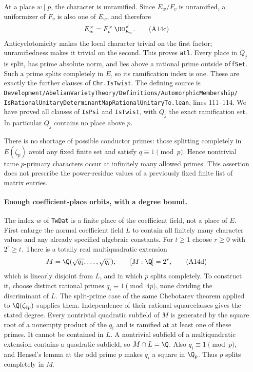 At a place $w\mid p$, the character is unramified.  Since
$E_w/F_v$ is unramified, a uniformizer of $F_v$ is also one of $E_w$,
and therefore
\[
 E_w^\times=F_v^\times\,\OO_{E_w}^\times.
 \tag{A14c}
\]
Anticyclotomicity makes the local character trivial on the first
factor; unramifiedness makes it trivial on the second.  This proves
\texttt{atl}.  Every place in $Q_j$ is split, has prime absolute norm,
and lies above a rational prime outside \texttt{offSet}.  Such a prime
splits completely in $E$, so its ramification index is one.  These are
exactly the further clauses of \texttt{Chr.IsTwist}.  The defining
source is
\texttt{Development/AbelianVarietyTheory/Definitions/AutomorphicMembership/}
\texttt{IsRationalUnitaryDeterminantMapRationalUnitaryTo.lean},
lines 111--114.  We have proved all clauses of
\texttt{IsPsi} and \texttt{IsTwist}, with $Q_j$ the exact ramification
set.  In particular $Q_j$ contains no place above $p$.

There is no shortage of possible conductor primes: those splitting
completely in $E(\zeta_p)$ avoid any fixed finite set and satisfy
$q\equiv1\pmod p$.  Hence nontrivial tame $p$-primary characters occur
at infinitely many allowed primes.  This assertion does not prescribe
the power-residue values of a previously fixed finite list of matrix
entries.

\paragraph{Enough coefficient-place orbits, with a degree bound.}
The index $w$ of \texttt{TwDat} is a finite place of the coefficient
field, not a place of $E$.  First enlarge the normal coefficient field
$L$ to contain all finitely many character values and any already
specified algebraic constants.  For $t\geq1$ choose $r\geq0$ with
$2^r\geq t$.  There is a totally real multiquadratic extension
\[
 M=\Q(\sqrt{q_1},\ldots,\sqrt{q_r}),
 \qquad [M:\Q]=2^r,
 \tag{A14d}
\]
which is linearly disjoint from $L$, and in which $p$ splits
completely.  To construct it, choose distinct rational primes
$q_i\equiv1\pmod{4p}$, none dividing the discriminant of $L$.
The split-prime case of the same Chebotarev theorem applied to
$\Q(\zeta_{4p})$ supplies them.  Independence of their rational
squareclasses gives the stated degree.  Every nontrivial quadratic
subfield of $M$ is generated by the square root of a nonempty product
of the $q_i$ and is ramified at at least one of these primes.
It cannot be contained in $L$.  A nontrivial subfield of a
multiquadratic extension contains a quadratic subfield, so
$M\cap L=\Q$.  Also $q_i\equiv1\pmod p$, and Hensel's lemma at the
odd prime $p$ makes $q_i$ a square in $\Q_p$.  Thus $p$ splits
completely in $M$.

